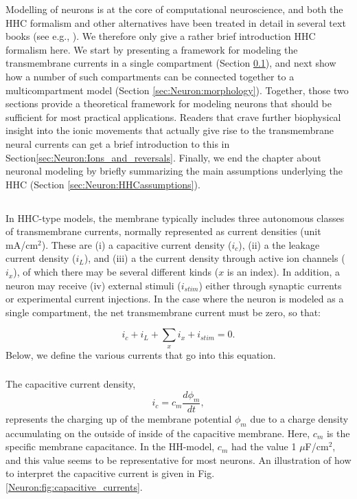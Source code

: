 Modelling of neurons is at the core of computational neuroscience, and both the HHC formalism and other alternatives have been treated in detail in several text books (see e.g., \citep{johnston1994foundations, KockSegev1998, Koch1999, Hille2001, Dayan2005, Sterratt2011}). We therefore only give a rather brief introduction HHC formalism here. We start by presenting a framework for modeling the transmembrane currents in a single compartment (Section \ref{sec:Neuron:membranecurrents}), and next show how a number of such compartments can be connected together to a multicompartment model (Section \ref{sec:Neuron:morphology}). Together, those two sections provide a theoretical framework for modeling neurons that should be sufficient for most practical applications. Readers that crave further biophysical insight into the ionic movements that actually give rise to the transmembrane neural currents can get a brief introduction to this in Section\ref{sec:Neuron:Ions_and_reversals}. Finally, we end the chapter about neuronal modeling by briefly summarizing the main assumptions underlying the HHC (Section \ref{sec:Neuron:HHCassumptions}).


\subsection{}
\label{sec:Neuron:membranecurrents}
In HHC-type models, the membrane typically includes three autonomous classes of transmembrane currents, normally represented as current densities (unit mA/cm$^2$). These are (i) a capacitive current density ($i_c$), (ii) a the leakage current density ($i_L$), and (iii) a the current density through active ion channels ($i_x$), of which there may be several different kinds ($x$ is an index). In addition, a neuron may receive  (iv) external stimuli ($i_{stim}$) either through synaptic currents or experimental current injections. In the case where the neuron is modeled as a single compartment, the net transmembrane current must be zero, so that:

\begin{equation}
i_c + i_L + \sum_x{i_x} +  i_{stim} = 0.
\label{Neuron:eq:singlecomp_zerosum}
\end{equation}
Below, we define the various currents that go into this equation.


\subsubsection{}
\label{sec:Neuron:Cap}
The capacitive current density,
\begin{equation}
i_c = c_m \frac{d\phi_m}{dt},
\label{Neuron:eq:HHcap}
\end{equation}
represents the charging up of the membrane potential $\phi_m$ due to a charge density accumulating on the outside of inside of the capacitive membrane. Here, $c_m$ is the specific membrane capacitance. In the HH-model, $c_m$ had the value
1 $\mu$F/cm$^2$, and this value seems to be representative for most neurons.  An illustration of how to interpret the capacitive current is given in Fig. \ref{Neuron:fig:capacitive_currents}. 

